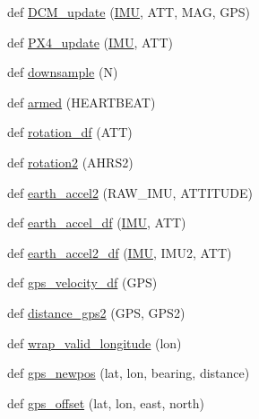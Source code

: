 \begin{DoxyCompactItemize}
def \mbox{\hyperlink{namespacepymavlink_1_1mavextra_a602868624e22e520d6376334c46aed97}{D\+C\+M\+\_\+update}} (\mbox{\hyperlink{side__camera__transform_8cpp_af4c1686b93c23e8b4b698c82c66845f4}{I\+MU}}, A\+TT, M\+AG, G\+PS)
\item 
def \mbox{\hyperlink{namespacepymavlink_1_1mavextra_a80093b7c26c5a448b247049fa10a203d}{P\+X4\+\_\+update}} (\mbox{\hyperlink{side__camera__transform_8cpp_af4c1686b93c23e8b4b698c82c66845f4}{I\+MU}}, A\+TT)
\item 
def \mbox{\hyperlink{namespacepymavlink_1_1mavextra_a6430a3ecdcd4b86e25851749bb4069b0}{downsample}} (N)
\item 
def \mbox{\hyperlink{namespacepymavlink_1_1mavextra_a00f2c88d67afcae53f725e0d8105adb1}{armed}} (H\+E\+A\+R\+T\+B\+E\+AT)
\item 
def \mbox{\hyperlink{namespacepymavlink_1_1mavextra_a8d3483c735e242ad8bb46001dae2284a}{rotation\+\_\+df}} (A\+TT)
\item 
def \mbox{\hyperlink{namespacepymavlink_1_1mavextra_abaf31a27857e3a949ad5166c35d11773}{rotation2}} (A\+H\+R\+S2)
\item 
def \mbox{\hyperlink{namespacepymavlink_1_1mavextra_a2e8ffaaf018bdd21bcc0dac891e88407}{earth\+\_\+accel2}} (R\+A\+W\+\_\+\+I\+MU, A\+T\+T\+I\+T\+U\+DE)
\item 
def \mbox{\hyperlink{namespacepymavlink_1_1mavextra_a51880208595cc665f7dd2af3e44390f2}{earth\+\_\+accel\+\_\+df}} (\mbox{\hyperlink{side__camera__transform_8cpp_af4c1686b93c23e8b4b698c82c66845f4}{I\+MU}}, A\+TT)
\item 
def \mbox{\hyperlink{namespacepymavlink_1_1mavextra_a40df15a3e1e1a67b2bb53a0b73d48d63}{earth\+\_\+accel2\+\_\+df}} (\mbox{\hyperlink{side__camera__transform_8cpp_af4c1686b93c23e8b4b698c82c66845f4}{I\+MU}}, I\+M\+U2, A\+TT)
\item 
def \mbox{\hyperlink{namespacepymavlink_1_1mavextra_a283e68b9dcd503bfedb6431c4815660c}{gps\+\_\+velocity\+\_\+df}} (G\+PS)
\item 
def \mbox{\hyperlink{namespacepymavlink_1_1mavextra_a4967f5a9f9d809005b0c7ec3ee25415c}{distance\+\_\+gps2}} (G\+PS, G\+P\+S2)
\item 
def \mbox{\hyperlink{namespacepymavlink_1_1mavextra_ab34a549c8b911b6455f2d641af495192}{wrap\+\_\+valid\+\_\+longitude}} (lon)
\item 
def \mbox{\hyperlink{namespacepymavlink_1_1mavextra_addedb30f8a88b98176fe226bfed8aaad}{gps\+\_\+newpos}} (lat, lon, bearing, distance)
\item 
def \mbox{\hyperlink{namespacepymavlink_1_1mavextra_ac5d6283932b9abee57818ce1c5a8b2c2}{gps\+\_\+offset}} (lat, lon, east, north)

\end{DoxyCompactItemize}
